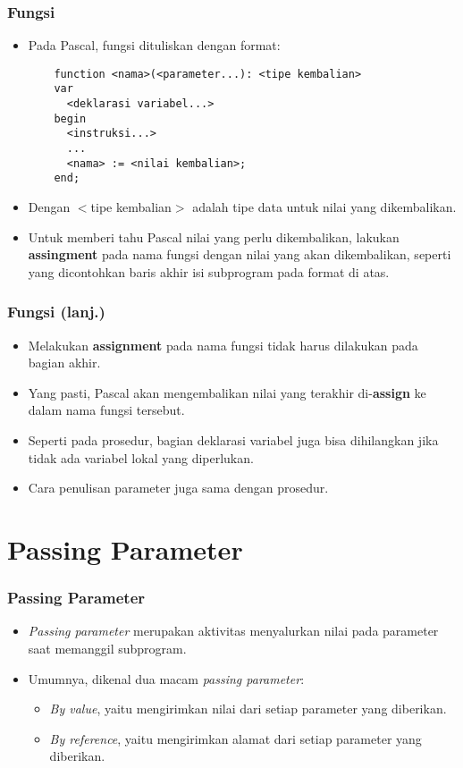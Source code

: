 \documentclass{beamer}
\begin{document}
\begin{frame}[fragile]
\frametitle{Fungsi}
\begin{itemize}
  \item Pada Pascal, fungsi dituliskan dengan format:
  \begin{lstlisting}
    function <nama>(<parameter...): <tipe kembalian>
    var
      <deklarasi variabel...>
    begin
      <instruksi...>
      ...
      <nama> := <nilai kembalian>;
    end;
  \end{lstlisting}
  \item Dengan $<$tipe kembalian$>$ adalah tipe data untuk nilai yang dikembalikan.
  \item Untuk memberi tahu Pascal nilai yang perlu dikembalikan, lakukan \textbf{assingment} pada nama fungsi dengan nilai yang akan dikembalikan, seperti yang dicontohkan baris akhir isi subprogram pada format di atas.
\end{itemize}
\end{frame}

\begin{frame}
\frametitle{Fungsi (lanj.)}
\begin{itemize}
  \item Melakukan \textbf{assignment} pada nama fungsi tidak harus dilakukan pada bagian akhir.
  \item Yang pasti, Pascal akan mengembalikan nilai yang terakhir di-\textbf{assign} ke dalam nama fungsi tersebut.
  \item Seperti pada prosedur, bagian deklarasi variabel juga bisa dihilangkan jika tidak ada variabel lokal yang diperlukan.
  \item Cara penulisan parameter juga sama dengan prosedur.
\end{itemize}
\end{frame}

\section{Passing Parameter}
\frame{\sectionpage}

\begin{frame}
\frametitle{Passing Parameter}
\begin{itemize}
  \item \textit{Passing parameter} merupakan aktivitas menyalurkan nilai pada parameter saat memanggil subprogram.
  \item Umumnya, dikenal dua macam \textit{passing parameter}:
  \begin{itemize}
    \item \textit{By value}, yaitu mengirimkan \alert{nilai} dari setiap parameter yang diberikan.
    \item \textit{By reference}, yaitu mengirimkan \alert{alamat} dari setiap parameter yang diberikan.
  \end{itemize}
\end{itemize}
\end{frame}
\end{document}
